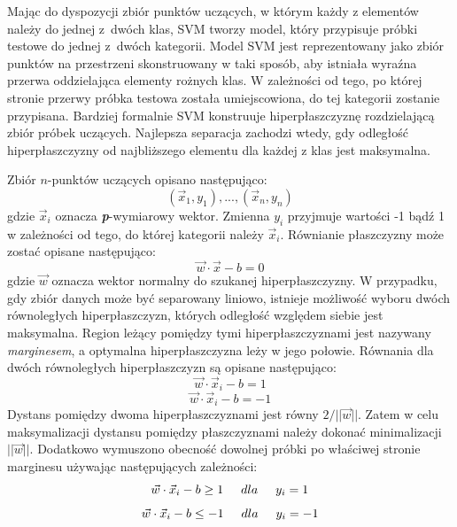 Mając do dyspozycji zbiór punktów uczących, w którym każdy z elementów należy do jednej z~dwóch klas, SVM tworzy model, który przypisuje próbki testowe do jednej z~dwóch kategorii. Model SVM jest reprezentowany jako zbiór punktów na przestrzeni skonstruowany w taki sposób, aby istniała wyraźna przerwa oddzielająca elementy rożnych klas. W zależności od tego, po której stronie przerwy próbka testowa została umiejscowiona, do tej kategorii zostanie przypisana. Bardziej formalnie SVM konstruuje hiperpłaszczyznę rozdzielającą zbiór próbek uczących. Najlepsza separacja zachodzi wtedy, gdy odległość hiperpłaszczyzny od najbliższego elementu dla każdej z klas jest maksymalna. 

Zbiór $n$-punktów uczących opisano następująco:
\begin{equation}
(\vec{x}_1,y_1), ..., (\vec{x}_n,y_n)
\end{equation}
gdzie $\vec{x}_i$ oznacza \textit{\textbf{p}}-wymiarowy wektor. Zmienna $y_i$ przyjmuje wartości -1 bądź 1 w zależności od tego, do której kategorii należy $\vec{x}_i$. Równianie płaszczyzny może zostać opisane następująco:
\begin{equation}
\vec{w}\cdot \vec{x} - b = 0
\end{equation}
gdzie $\vec{w}$ oznacza wektor normalny do szukanej hiperpłaszczyzny. W przypadku, gdy zbiór danych może być separowany liniowo, istnieje możliwość wyboru dwóch równoległych hiperpłaszczyzn, których odległość względem siebie jest maksymalna. Region leżący pomiędzy tymi hiperpłaszczyznami jest nazywany \textit{marginesem}, a optymalna hiperpłaszczyzna leży w jego połowie. Równania dla dwóch równoległych hiperpłaszczyzn są opisane następująco:
\begin{equation}
\vec{w}\cdot \vec{x}_i - b = 1
\end{equation}
\begin{equation}
\vec{w}\cdot \vec{x}_i - b = -1
\end{equation}
Dystans pomiędzy dwoma hiperpłaszczyznami jest równy $2 /||\vec{w}||$. Zatem w celu maksymalizacji dystansu pomiędzy płaszczyznami należy dokonać minimalizacji $||\vec{w}||$. Dodatkowo wymuszono obecność dowolnej próbki po właściwej stronie marginesu używając następujących zależności:
\begin{equation}
\vec{w}\cdot \vec{x}_i - b \geq 1 \hspace{0.5cm} dla \hspace{0.5cm} y_i = 1 
\end{equation}
\begin{equation}
\vec{w}\cdot \vec{x}_i - b \leq -1 \hspace{0.5cm} dla \hspace{0.5cm} y_i = -1
\end{equation}
